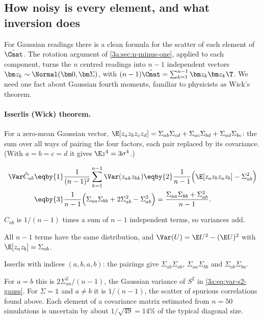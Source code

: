 \subsection{How noisy is every element, and what inversion does}
\label{3a:sec:cov-noise}

For Gaussian readings there is a clean formula for the scatter of each
element of $\hat\Cmat$. The rotation argument of
\cref{3a:sec:n-minus-one}, applied to each component, turns the $n$ centred
readings into $n-1$ independent vectors $\bm z_k\sim\Normal(\bm0,\bm\Sigma)$,
with $(n-1)\hat\Cmat=\sum_{k=1}^{n-1}\bm z_k\bm z_k\T$. We need one fact
about Gaussian fourth moments, familiar to physicists as Wick's theorem.

\paragraph{Isserlis (Wick) theorem.}
For a zero-mean Gaussian vector,
$\E[z_az_bz_cz_d]=\Sigma_{ab}\Sigma_{cd}+\Sigma_{ac}\Sigma_{bd}+\Sigma_{ad}\Sigma_{bc}$:
the sum over all ways of pairing the four factors, each pair replaced by its
covariance. (With $a=b=c=d$ it gives $\E z^4=3\sigma^4$.)

\begin{align}
  \Var\hat C_{ab}
  &\eqby{1} \frac{1}{(n-1)^2}\sum_{k=1}^{n-1}\Var(z_{ak}z_{bk})
   \eqby{2} \frac{1}{n-1}\Bigl(\E[z_az_bz_az_b]-\Sigma_{ab}^2\Bigr) \nonumber\\
  &\eqby{3} \frac{1}{n-1}\Bigl(\Sigma_{aa}\Sigma_{bb}+2\Sigma_{ab}^2-\Sigma_{ab}^2\Bigr)
   = \frac{\Sigma_{aa}\Sigma_{bb}+\Sigma_{ab}^2}{n-1} .
  \label{3a:eq:var-cov-element}
\end{align}
\begin{explain}
  \item $\hat C_{ab}$ is $1/(n-1)$ times a sum of $n-1$ independent terms, so variances add.
  \item All $n-1$ terms have the same distribution, and $\Var(U)=\E U^2-(\E U)^2$ with $\E[z_az_b]=\Sigma_{ab}$.
  \item Isserlis with indices $(a,b,a,b)$: the pairings give $\Sigma_{ab}\Sigma_{ab}$, $\Sigma_{aa}\Sigma_{bb}$ and $\Sigma_{ab}\Sigma_{ba}$.
\end{explain}
For $a=b$ this is $2\Sigma_{aa}^2/(n-1)$, the Gaussian variance of $S^2$ in
\eqref{3a:eq:var-s2-gauss}. For $\Sigma=\mathbb{1}$ and $a\neq b$ it is
$1/(n-1)$, the scatter of spurious correlations found above. Each element
of a covariance matrix estimated from $n=50$ simulations is uncertain by
about $1/\sqrt{49}=14\%$ of the typical diagonal size.

